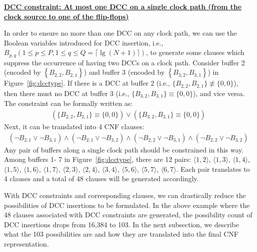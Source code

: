 {\noindent \textbf{\uline{DCC constraint: At most one DCC on a single clock path (from the clock source to one of the flip-flops)}}}

In order to ensure no more than one DCC on any clock path, we can use the Boolean variables introduced for DCC insertion, i.e., {\fontsize{9}{10}$B_{p,q} \left(1 \leq p \leq P, 1 \leq q \leq Q = \lceil \lg (N + 1) \rceil \right)$}, to generate some clauses which suppress the occurrence of having two DCCs on a clock path. Consider buffer 2 (encoded by {\fontsize{9}{10}$\left\{B_{2,2}, B_{2,1}\right\}$}) and buffer 3 (encoded by {\fontsize{9}{10}$\left\{B_{3,2}, B_{3,1}\right\}$}) in Figure~\ref{fig:dcctype}. If there is a DCC at buffer 2 (i.e., {\fontsize{9}{10}$\{B_{2,2}, B_{2,1}\} \not\equiv \{0, 0\}$}), then there must no DCC at buffer 3 (i.e., {\fontsize{9}{10}$\{B_{3,2}, B_{3,1}\} \equiv \{0, 0\}$}), and vice versa. The constraint can be formally written as:
{\fontsize{9}{10}
\begin{gather*}
\left(\{B_{2,2}, B_{2,1}\} \equiv \{0, 0\}\right) \lor \left(\{B_{3,2}, B_{3,1}\} \equiv \{0, 0\}\right)
\end{gather*}}
Next, it can be translated into 4 CNF clauses:
{\fontsize{9}{10}
\begin{equation*}
\begin{split}
(\neg B_{2,1}\lor\neg B_{3,1}) \land (\neg B_{2,1}\lor\neg B_{3,2}) \land (\neg B_{2,2}\lor\neg B_{3,1}) \land (\neg B_{2,2}\lor\neg B_{3,2})
\end{split}
\end{equation*}}
Any pair of buffers along a single clock path should be constrained in this way. Among buffers 1- 7 in Figure~\ref{fig:dcctype}, there are 12 pairs: $\langle1, 2\rangle$, $\langle1, 3\rangle$, $\langle1, 4\rangle$, $\langle1, 5\rangle$, $\langle1, 6\rangle$, $\langle1, 7\rangle$, $\langle2, 3\rangle$, $\langle2, 4\rangle$, $\langle3, 4\rangle$, $\langle5, 6\rangle$, $\langle5, 7\rangle$, $\langle6, 7\rangle$. Each pair translates to 4 clauses and a total of 48 clauses will be generated accordingly.

With DCC constraints and corresponding clauses, we can drastically reduce the possibilities of DCC insertions to be formulated. In the above example where the 48 clauses associated with DCC constraints are generated, the possibility count of DCC insertions drops from 16,384 to 103. In the next subsection, we describe what the 103 possibilities are and how they are translated into the final CNF representation.

